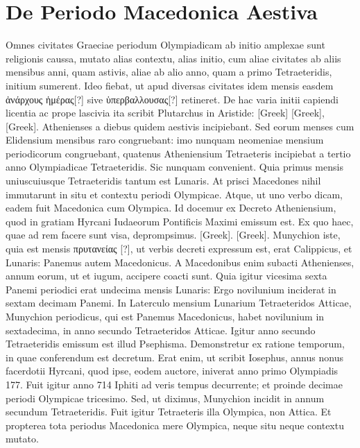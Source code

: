 \section{De Periodo Macedonica Aestiva}

Omnes civitates Graeciae periodum Olympiadicam ab initio
amplexae sunt religionis caussa, mutato alias contextu, alias
initio, cum aliae civitates ab aliis mensibus anni, quam astivis,
aliae ab alio anno, quam a primo Tetraeteridis, initium sumerent.
Ideo
fiebat, ut apud diversas civitates idem mensis easdem
 \textgreek{ἀνάρχους ἡμέρας[?]}
sive \textgreek{ὑπερβαλλουσας[?]} retineret.
De hac varia initii capiendi licentia ac
prope lascivia ita scribit Plutarchus in Aristide: \textgreek{[Greek]}
\textgreek{[Greek]},
\textgreek{[Greek]}.
Athenienses a diebus
quidem aestivis incipiebant.
Sed eorum menses cum Elidensium
mensibus raro congruebant: imo nunquam neomeniae mensium periodicorum
congruebant, quatenus Atheniensium Tetraeteris incipiebat
a tertio anno Olympiadicae Tetraeteridis.
Sic nunquam convenient.
Quia primus mensis uniuscuiusque Tetraeteridis tantum est
Lunaris.
At prisci Macedones nihil immutarunt in situ et contextu
periodi Olympicae.
Atque, ut uno verbo dicam, eadem fuit Macedonica
cum Olympica.
Id docemur ex Decreto Atheniensium, quod in
gratiam Hyrcani Iudaeorum Pontificis Maximi emissum est.
Ex quo
haec, quae ad rem facere sunt visa, deprompsimus.
\textgreek{[Greek]}.
\textgreek{[Greek]}.
Munychion
iste, quia est mensis \textgreek{πρυτανείας [?]},
 ut verbis decreti expressum est,
erat Calippicus, et Lunaris: Panemus autem Macedonicus.
A Macedonibus
enim subacti Athenienses, annum eorum, ut et iugum, accipere
coacti sunt.
Quia igitur vicesima sexta Panemi periodici erat undecima
mensis Lunaris: Ergo novilunium inciderat in sextam decimam
Panemi.
In Laterculo mensium Lunarium Tetraeteridos Atticae,
Munychion periodicus, qui est Panemus Macedonicus, habet novilunium
in sextadecima, in anno secundo Tetraeteridos Atticae.
Igitur anno
secundo Tetraeteridis emissum est illud Psephisma.
Demonstretur
ex ratione temporum, in quae conferendum est decretum.
Erat enim,
ut scribit Iosephus, annus nonus facerdotii Hyrcani, quod ipse, eodem
auctore, iniverat anno primo Olympiadis 177.
Fuit igitur anno 714
Iphiti ad veris tempus decurrente; et proinde decimae periodi Olympicae
tricesimo.
Sed, ut diximus, Munychion incidit in annum
secundum Tetraeteridis.
Fuit igitur Tetraeteris illa Olympica,
non Attica.
Et propterea tota periodus Macedonica mere Olympica,
neque situ neque contextu mutato.

